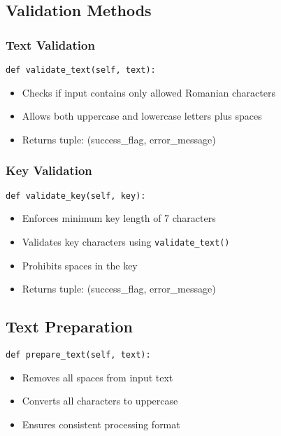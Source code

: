 \documentclass[12pt]{article}
\begin{document}
\subsection*{Validation Methods}
\subsubsection*{Text Validation}
\begin{verbatim}
def validate_text(self, text):
\end{verbatim}
\begin{itemize}
    \item Checks if input contains only allowed Romanian characters
    \item Allows both uppercase and lowercase letters plus spaces
    \item Returns tuple: (success\_flag, error\_message)
\end{itemize}

\subsubsection*{Key Validation}
\begin{verbatim}
def validate_key(self, key):
\end{verbatim}
\begin{itemize}
    \item Enforces minimum key length of 7 characters
    \item Validates key characters using \texttt{validate\_text()}
    \item Prohibits spaces in the key
    \item Returns tuple: (success\_flag, error\_message)
\end{itemize}

\subsection*{Text Preparation}
\begin{verbatim}
def prepare_text(self, text):
\end{verbatim}
\begin{itemize}
    \item Removes all spaces from input text
    \item Converts all characters to uppercase
    \item Ensures consistent processing format
\end{itemize}
\end{document}
